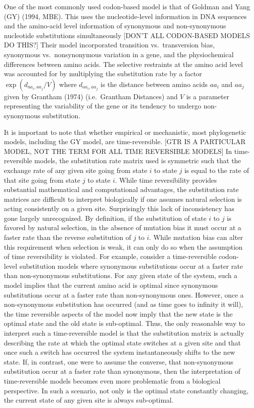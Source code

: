 \documentclass[13pt]{article}
\begin{document}
One of the most commonly used codon-based model is that of Goldman and Yang (GY) (1994, MBE).
This uses the nucleotide-level information in DNA sequences and the amino-acid level information of synonymous and non-synonymous nucleotide substitutions simultaneously [DON'T ALL CODON-BASED MODELS DO THIS?]
Their model incorporated transition vs.~transversion bias, synonymous vs.~nonsynonymous variation in a gene, and the physiochemical differences between amino acids.
The selective restraints at the amino acid level was accounted for by multiplying the substitution rate by a factor $\exp (d_{aa_i,aa_j}/V)$ where $d_{aa_i, aa_j}$ is the distance between amino acids $aa_i$ and $aa_j$ given by Grantham (1974) (i.e.~Grantham Distances) and $V$ is a parameter representing the variability of the gene or its tendency to undergo non-synonymous substitution.


It is important to note that whether empirical or mechanistic, most phylogenetic models, including the GY model, are time-reversible. [GTR IS A PARTICULAR MODEL, NOT THE TERM FOR ALL TIME REVERSIBLE MODELS]
In time-reversible models, the substitution rate matrix used is symmetric such that the exchange rate of any given site going from state $i$ to state $j$ is equal to the rate of that site going from state $j$ to state $i$.
While time reversibility provides substantial mathematical and computational advantages, the substitution rate matrices are difficult to interpret biologically if one assumes natural selection is acting consistently on a given site.
Surprisingly this lack of inconsistency has gone largely unrecognized.
By definition, if the substitution of state $i$ to $j$ is favored by natural selection, in the absence of mutation bias it must occur at a faster rate than the reverse substitution of $j$ to $i$.
While mutation bias can alter this requirement when selection is weak, it can only do so when the assumption of time reversibility is violated.
For example, consider a time-reversible codon-level substitution models where synonymous substitutions occur at a faster rate than non-synonymous substitutions.
For any given state of the system, such a model implies that the current amino acid is optimal since synonymous substitutions occur at a faster rate than non-synonymous ones.
However, once a non-synonymous substitution has occurred (and as time goes to infinity it will),  the time reversible aspects of the model now imply that the new state is the optimal state and the old state is sub-optimal.
Thus, the only reasonable way to interpret such a time-reversible model is that the substitution matrix is actually describing the rate at which the optimal state switches at a given site and that once such a switch has occurred the system instantaneously shifts to the new state.
If, in contrast, one were to assume the converse, that non-synonymous substitution occur at a faster rate than synonymous, then the interpretation of time-reversible models becomes even more problematic from a biological perspective.
In such a scenario, not only is the optimal state constantly changing, the current state of any given site is always sub-optimal.
\end{document}
